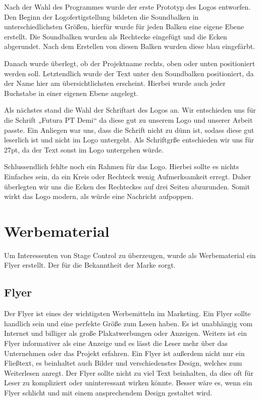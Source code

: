 Nach der Wahl des Programmes wurde der erste Prototyp des Logos entworfen. Den Beginn der Logofertigstellung bildeten die Soundbalken in unterschiedlichsten Größen, hierfür wurde für jeden Balken eine eigene Ebene erstellt. Die Soundbalken wurden als Rechtecke eingefügt und die Ecken abgerundet. Nach dem Erstellen von diesen Balken wurden diese blau eingefärbt. 

Danach wurde überlegt, ob der Projektname rechts, oben oder unten positioniert werden soll. Letztendlich wurde der Text unter den Soundbalken positioniert, da der Name hier am übersichtlichsten erscheint. Hierbei wurde auch jeder Buchstabe in einer eigenen Ebene angelegt. 

Als nächstes stand die Wahl der Schriftart des Logos an. Wir entschieden uns für die Schrift „Futura PT Demi“ da diese gut zu unserem Logo und unserer Arbeit passte. Ein Anliegen war uns, dass die Schrift nicht zu dünn ist, sodass diese gut leserlich ist und nicht im Logo untergeht. Als Schriftgrße entschieden wir uns für 27pt, da der Text sonst im Logo untergehen würde. 

Schlussendlich fehlte noch ein Rahmen für das Logo. Hierbei sollte es nichts Einfaches sein, da ein Kreis oder Rechteck wenig Aufmerksamkeit erregt. Daher überlegten wir uns die Ecken des Rechteckes auf drei Seiten abzurunden. Somit wirkt das Logo modern, als würde eine Nachricht aufpoppen. 

\section{Werbematerial}
Um Interessenten von Stage Control zu überzeugen, wurde als Werbematerial ein Flyer erstellt. Der für die Bekanntheit der Marke sorgt.

\subsection{Flyer}
Der Flyer ist eines der wichtigsten Werbemitteln im Marketing. Ein Flyer sollte handlich sein und eine perfekte Größe zum Lesen haben. Es ist unabhängig vom Internet und billiger als große Plakatwerbungen oder Anzeigen. Weiters ist ein Flyer informativer als eine Anzeige und es lässt die Leser mehr über das Unternehmen oder das Projekt erfahren. Ein Flyer ist außerdem nicht nur ein Fließtext, es beinhaltet auch Bilder und verschiedenstes Design, welches zum Weiterlesen anregt. Der Flyer sollte nicht zu viel Text beinhalten, da dies oft für Leser zu kompliziert oder uninteressant wirken könnte. Besser wäre es, wenn ein Flyer schlicht und mit einem ansprechendem Design gestaltet wird. \parencite{VorteilevonFlyern}

